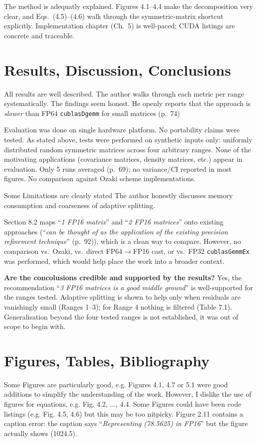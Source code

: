 \documentclass[11pt,a4paper]{article}
\newcommand{\q}[1]{``\textit{#1}''}
\newcommand{\pg}[1]{(p.~#1)}
\begin{document}
The method is adequatly explained.
Figures 4.1--4.4 make the decomposition very clear, and Eqs.~(4.5)--(4.6) walk through the symmetric-matrix shortcut explicitly.
Implementation chapter (Ch.~5) is well-paced; CUDA listings are concrete and traceable.

\section{Results, Discussion, Conclusions}
All results are well described.
The author walks through each metric per range systematically.
The findings seem honest.
He openly reports that the approach is \emph{slower} than FP64 \texttt{cublasDgemm} for small matrices \pg{74}

Evaluation was done on single hardware platform.
No portability claims were tested.
As stated above, tests were performed on synthetic inputs only:
uniformly distributed random symmetric matrices across four arbitrary ranges.
None of the motivating applications (covariance matrices, density matrices, etc.) appear in evaluation.
Only 5 runs averaged \pg{69}; no variance/CI reported in most figures.
No comparison against Ozaki scheme implementations.

Some Limitations are clearly stated
The author honestly discusses memory consumption and coarseness of adaptive splitting.

Section 8.2 maps \q{1 FP16 matrix} and \q{2 FP16 matrices} onto existing approaches
(\q{can be thought of as the application of the existing precision refinement technique} \pg{92}), which is a clean way to compare.
However, no comparison vs.~Ozaki, vs.~direct FP64$\to$FP16 cast, or vs.~FP32 \texttt{cublasGemmEx} was performed, which would help place the work into a broader context.

\textbf{Are the concolusions credible and supported by the results?}
Yes, the recommendation \q{3 FP16 matrices is a good middle ground} is well-supported for the ranges tested.
Adaptive splitting is shown to help only when residuals are vanishingly small (Ranges 1--3); for Range 4 nothing is filtered (Table 7.1).
Generalisation beyond the four tested ranges is not established, it was out of scope to begin with.

\section{Figures, Tables, Bibliography}
Some Figures are particularly good, e.g. Figures 4.1, 4.7 or 5.1 were good additions to simplify the understanding of the work.
However, I dislike the use of figures for equations, e.g. Fig. 4.2, ..., 4.4.
Some Figures could have been code listings (e.g. Fig. 4.5, 4.6) but this may be too nitpicky.
Figure 2.11 contains a caption error: the caption says \q{Representing (78.5625) in FP16} but the figure actually shows (1024.5).
\end{document}
